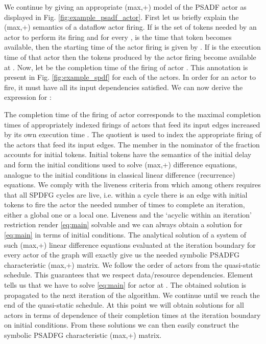 \documentclass[]{eptcs}
\begin{document}
We continue by giving an appropriate (max,+) model of the PSADF actor as displayed in Fig. \ref{fig:example_psadf_actor}. First let us briefly explain the (max,+) semantics of a dataflow actor firing. If  is the set of tokens needed by an actor to perform its firing and for every ,  is the time that token becomes available, then the starting time of the actor firing is given by . If  is the execution time of that actor then the tokens produced by the actor firing become available at .
Now, let  be the completion time of the  firing of actor . This annotation is present in Fig. \ref{fig:example_spdf} for each of the actors. 
In order for an actor to fire, it must have all its input dependencies satisfied. We can now derive the expression for :
 
The completion time of the  firing of actor  corresponds to the maximal completion times of appropriately indexed firings of actors that feed its input edges  increased by its own execution time . The quotient  is used to index the appropriate firing of the actors that feed its input edges. The  member in the nominator of the fraction accounts for initial tokens. Initial tokens have the semantics of the initial delay and form the initial conditions used to solve (max,+) difference equations, analogue to the initial conditions in classical linear difference (recurrence) equations. We comply with the liveness criteria from \cite{2frad:all} which among others requires that all SPDFG cycles are live, i.e. within a cycle there is an edge with initial tokens to fire the actor the needed number of times to complete an iteration, either a global one or a local one. Liveness and the `acyclic within an iteration' restriction render \eqref{eq:main} solvable and we can always obtain a solution for \eqref{eq:main} in terms of initial conditions. The analytical solution of a system of such (max,+) linear difference equations evaluated at the iteration boundary for every actor of the graph will exactly give us the needed symbolic PSADFG characteristic (max,+) matrix. We follow the order of actors from the quasi-static schedule. This guarantees that we respect data/resource dependencies. Element  tells us that we have to solve \eqref{eq:main} for actor  at . The obtained solution is propagated to the next iteration of the algorithm. We continue until we reach the end of the quasi-static schedule. At this point we will obtain solutions for all actors in terms of dependence of their completion times at the iteration boundary on initial conditions. From these solutions we can then easily construct the symbolic PSADFG characteristic (max,+) matrix. 
\end{document}

